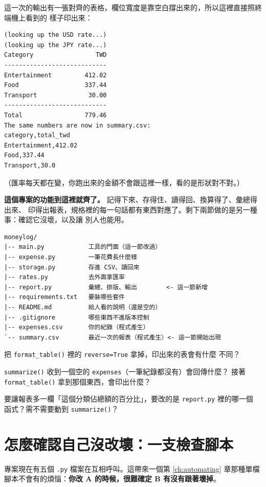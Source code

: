 這一次的輸出有一張對齊的表格，欄位寬度是靠空白撐出來的，所以這裡直接照終端機上看到的
樣子印出來：

\begin{verbatim}
(looking up the USD rate...)
(looking up the JPY rate...)
Category                 TWD
----------------------------
Entertainment         412.02
Food                  337.44
Transport              30.00
----------------------------
Total                 779.46
The same numbers are now in summary.csv:
category,total_twd
Entertainment,412.02
Food,337.44
Transport,30.0
\end{verbatim}

（匯率每天都在變，你跑出來的金額不會跟這裡一樣，看的是形狀對不對。）

\textbf{這個專案的功能到這裡就齊了。} 記得下來、存得住、讀得回、換算得了、彙總得出來、
印得出報表，規格裡的每一句話都有東西對應了。剩下兩節做的是另一種事：確認它沒壞，以及讓
別人也能用。

\begin{verbatim}
moneylog/
|-- main.py            工具的門面（這一節改過）
|-- expense.py         一筆花費長什麼樣
|-- storage.py         存進 CSV、讀回來
|-- rates.py           去外面拿匯率
|-- report.py          彙總、排版、輸出        <- 這一節新增
|-- requirements.txt   要裝哪些套件
|-- README.md          給人看的說明（還是空的）
|-- .gitignore         哪些東西不進版本控制
|-- expenses.csv       你的紀錄（程式產生）
`-- summary.csv        最近一次的報表（程式產生）<- 這一節開始出現
\end{verbatim}

\begin{drills}[label=drills:capstone-report]
\item 把 \texttt{format\_table()} 裡的 \texttt{reverse=True} 拿掉，印出來的表會有什麼
不同？
\item \texttt{summarize()} 收到一個空的 \texttt{expenses}（一筆紀錄都沒有）會回傳什麼？
接著 \texttt{format\_table()} 拿到那個東西，會印出什麼？
\item 要讓報表多一欄「這個分類佔總額的百分比」，要改的是 \texttt{report.py} 裡的哪一個
函式？需不需要動到 \texttt{summarize()}？
\end{drills}

\section{怎麼確認自己沒改壞：一支檢查腳本}
\label{sec:capstone-tests}

專案現在有五個 \texttt{.py} 檔案在互相呼叫。這帶來一個第 \ref{ch:automating} 章那種單檔
腳本不會有的煩惱：\textbf{你改 A 的時候，很難確定 B 有沒有跟著壞掉}。

